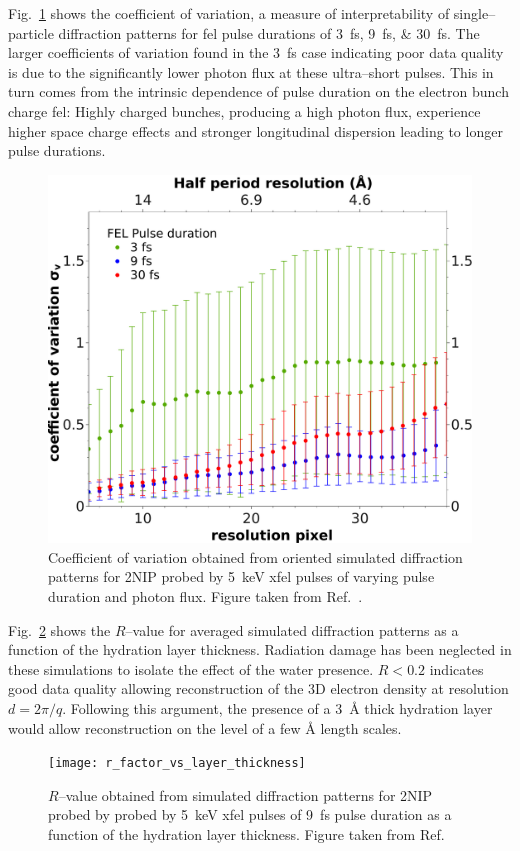 \documentclass[10pt]{scrartcl}
\begin{document}
Fig.~\ref{fig:varcoeff} shows the coefficient of variation, a measure of
interpretability of single--particle diffraction patterns \cite{Yoon2016,Fortmann-Grote2017}
for \gls{fel} pulse durations of \SIlist{3;9;30}{\femto\second}. The larger
coefficients of variation found in the  \SI{3}{\femto\second} case indicating
poor data quality is due to the significantly lower photon flux at these
ultra--short pulses. This in turn comes from the intrinsic dependence of pulse
duration on the electron bunch charge \gls{fel}: Highly charged bunches,
producing a high photon flux, experience higher space charge effects and stronger longitudinal dispersion
leading to longer pulse durations.
%
\begin{figure}[ht]
  \begin{center}
    \includegraphics[width=.8\textwidth,angle=0,clip]{figures/varcoeff_3-9-30-crop}
  \end{center}
  \caption{Coefficient of variation obtained from oriented simulated diffraction
  patterns for 2NIP probed by \SI{5}{\kilo\electronvolt} \gls{xfel} pulses of
varying pulse duration and photon flux. Figure taken from Ref.~\cite{Fortmann-Grote2017}.}
  \label{fig:varcoeff}
\end{figure}
%

Fig.~\ref{fig:R_value_hydration} shows the $R$--value for averaged simulated
diffraction patterns as a function of the hydration layer thickness. Radiation
damage has been neglected in these simulations to isolate the effect of the
water presence. $R < 0.2$ indicates good data quality allowing reconstruction of
the 3D electron density at resolution $d=2\pi/q$. Following this argument, the presence of a
\SI{3}{\angstrom} thick hydration layer would allow reconstruction on the level
of a few \si{\angstrom} length scales.
%
\begin{figure}[ht]
  \begin{center}
    \texttt{[image: r\_factor\_vs\_layer\_thickness]}
  \end{center}
  \caption{$R$--value obtained from simulated diffraction patterns for 2NIP
  probed by probed by \SI{5}{\kilo\electronvolt} \gls{xfel} pulses of
  \SI{9}{\femto\second} pulse duration as a function of the hydration layer
  thickness. Figure taken from Ref.~\cite{Fortmann-Grote2017b}}
  \label{fig:R_value_hydration}
\end{figure}
\end{document}
